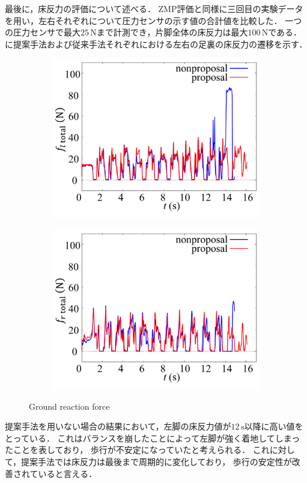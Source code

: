 \documentclass[autodetect-engine,dvipdfmx-if-dvi,ja=standard,a4j,jbase=11pt,magstyle=nomag*]{bxjsreport}
\begin{document}
最後に，床反力の評価について述べる．
ZMP評価と同様に三回目の実験データを用い，左右それぞれについて圧力センサの示す値の合計値を比較した．
一つの圧力センサで最大$25 \,\mathrm{N}$まで計測でき，片脚全体の床反力は最大$100 \,\mathrm{N}$である．
に提案手法および従来手法それぞれにおける左右の足裏の床反力の遷移を示す．
\begin{figure}[t]
    \centering
    \begin{subfigure}[c]{0.50\linewidth}
        \centering%
        \includegraphics[width=\linewidth, clip]{./figure/fig12a.pdf}%
        \label{fig:fl_total}%
    \end{subfigure}%
    \begin{subfigure}[c]{0.5\linewidth}
        \centering%
        \includegraphics[width=\linewidth, clip]{./figure/fig12b.pdf}%
        \label{fig:fr_total}%
    \end{subfigure}%
    \caption{Ground reaction force}%
    \label{fig:force}%
\end{figure}
提案手法を用いない場合の結果において，左脚の床反力値が$12\,\mathrm{s}$以降に高い値をとっている．
これはバランスを崩したことによって左脚が強く着地してしまったことを表しており，
歩行が不安定になっていたと考えられる．
これに対して，提案手法では床反力は最後まで周期的に変化しており，
歩行の安定性が改善されていると言える．
\end{document}
